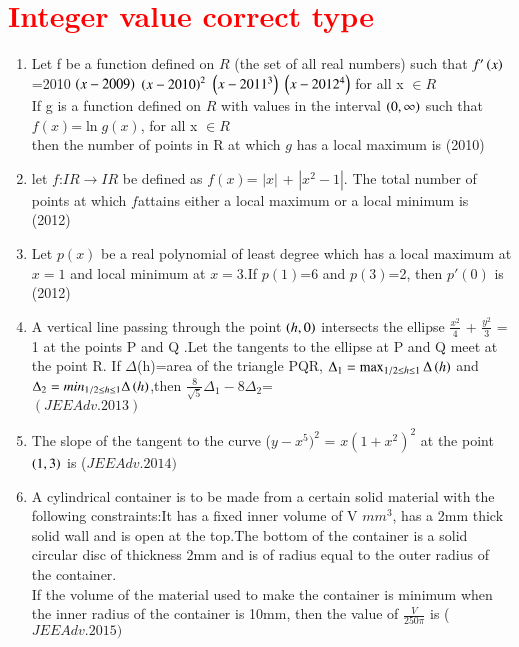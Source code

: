 \documentclass[journal,12pt,twocolumn]{IEEEtran}
\theoremstyle{remark}
\begin{document}
																				 \section{\textcolor{red}{Integer value correct type}}
																				 \begin{enumerate}
																				 \item Let f be a function defined on $R$ (the set of all real numbers) such that $f'\left(x\right)$=2010 $\left(x-2009\right)$ $\left(x-2010\right)^2$ $\left(x-2011^3\right)$ $\left(x-2012^4\right)$ for all x $\in R$ \\ If g is a function defined on $R$ with values in the interval $\left(0,\infty\right)$ such that \\
																				   $f(x)$=$\ln{g(x)}$, for all x $\in R$\\ then the number of points in R at which $g$ has a local maximum is \hfill (2010)\\
																				   \item let $f$:$IR \rightarrow IR$ be defined as $f(x)$= $|x|$ + $|x^2-1|$. The total number of points at which $f$attains either a local maximum or a local minimum is\\ \hfill (2012) \\
																				   \item Let $p(x)$ be a real polynomial of least degree which has a local maximum at $x=1$ and local minimum at $x=3$.If $p(1)$=6 and $p(3)$=2, then $p'(0)$ is \hfill (2012) \\
																				   \item A vertical line passing through the point $\left(h,0\right)$ intersects the ellipse $\frac{x^2}{4}$ + $\frac{y^2}{3}$ = 1 at the points P and Q .Let the tangents to the ellipse at P and Q meet at the point R. If $\Delta$(h)=area of the triangle PQR, $\Delta_1  = \max _{1/2\leq h \leq 1}\Delta\left(h\right)$ and $\Delta_2 = min_{1/2\leq h \leq 1}\Delta\left(h\right)$,then $\frac{8}{\sqrt{5}}\Delta_1 - 8\Delta_2$=\\\hfill $(JEEAdv.2013)$\\
																				   \item The slope of the tangent to the curve ($y-x^5)^2$ = $x(1+x^2)^2$ at the point $\left(1,3\right)$ is \hfill ($JEE Adv. 2014)$ \\
																				   \item A cylindrical container is to be made from a certain solid material with the following constraints:It has a fixed inner volume of V $mm^3$, has a 2mm thick solid wall and is open at the top.The bottom of the container is a solid circular disc of thickness 2mm and is of radius equal to the outer radius of the container.\\If the volume of the material used to make the container is minimum when the inner radius of the container is 10mm, then the value of $\frac{V}{250\pi}$ is \hfill ($JEE Adv. 2015)$ \\  
																				   \end{enumerate}
																				   
\end{document}
